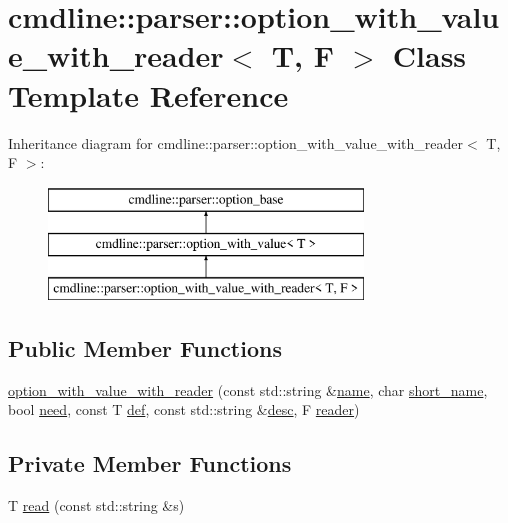 \hypertarget{classcmdline_1_1parser_1_1option__with__value__with__reader}{}\section{cmdline\+::parser\+::option\+\_\+with\+\_\+value\+\_\+with\+\_\+reader$<$ T, F $>$ Class Template Reference}
\label{classcmdline_1_1parser_1_1option__with__value__with__reader}
Inheritance diagram for cmdline\+::parser\+::option\+\_\+with\+\_\+value\+\_\+with\+\_\+reader$<$ T, F $>$\+:\begin{figure}[H]
\begin{center}
\leavevmode
\includegraphics[height=3.000000cm]{classcmdline_1_1parser_1_1option__with__value__with__reader}
\end{center}
\end{figure}
\subsection*{Public Member Functions}
\begin{DoxyCompactItemize}
\item 
\mbox{\hyperlink{classcmdline_1_1parser_1_1option__with__value__with__reader_a408c571b8600e58520f8600f84070527}{option\+\_\+with\+\_\+value\+\_\+with\+\_\+reader}} (const std\+::string \&\mbox{\hyperlink{classcmdline_1_1parser_1_1option__with__value_a37a101909b8d912d9cab296be19328da}{name}}, char \mbox{\hyperlink{classcmdline_1_1parser_1_1option__with__value_a2ebacba0864e4473cefc8a4a967f4ab1}{short\+\_\+name}}, bool \mbox{\hyperlink{classcmdline_1_1parser_1_1option__with__value_adb73da6126c1ea28a2375c5b94ece4c6}{need}}, const T \mbox{\hyperlink{classcmdline_1_1parser_1_1option__with__value_a0d856f6886e383f0fe2407a95c5f590b}{def}}, const std\+::string \&\mbox{\hyperlink{classcmdline_1_1parser_1_1option__with__value_aab2cea1b63e3d310e10d00810d91ddb0}{desc}}, F \mbox{\hyperlink{classcmdline_1_1parser_1_1option__with__value__with__reader_a1d06ee0129f99751c6461b7fe3dc844b}{reader}})
\end{DoxyCompactItemize}
\subsection*{Private Member Functions}
\begin{DoxyCompactItemize}
\item 
T \mbox{\hyperlink{classcmdline_1_1parser_1_1option__with__value__with__reader_a47db1ae274bc54b14d8f4e414ce3549a}{read}} (const std\+::string \&s)
\end{DoxyCompactItemize}
